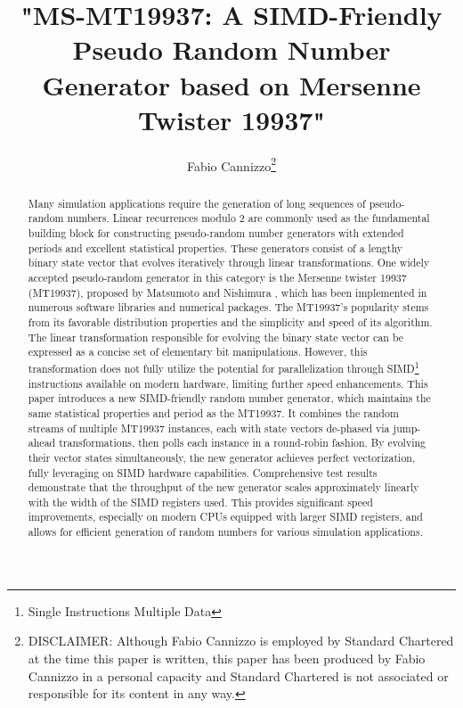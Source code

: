 \documentclass[preprint,1p,times]{elsarticle}
\begin{document}
\newenvironment{myitemize}
{ \begin{itemize} [topsep= 3pt] %
    \setlength{\itemsep}{0pt}
    \setlength{\parskip}{0pt}
    \setlength{\parsep}{0pt}     }
{ \end{itemize}                  }

\newcommand {\inred}[1] {\textcolor{red}{#1}}
\newcommand {\curle}[1]{ \left \{      #1 \right \}      }
\newcommand\XOR{\mathbin{\oplus}}
\newcommand\OR{\mid}
\newcommand\AND{\&}



\begin{frontmatter}
\title{"MS-MT19937: A SIMD-Friendly Pseudo Random Number Generator based on Mersenne Twister 19937"}

\author{\renewcommand*{\thefootnote}{\fnsymbol{footnote}}
	Fabio Cannizzo\footnote{DISCLAIMER: Although Fabio Cannizzo is employed by Standard Chartered at the time this paper is written, this paper has been produced by Fabio Cannizzo in a personal capacity and Standard Chartered is not associated or responsible for its content in any way.}}

\begin{abstract}
Many simulation applications require the generation of long sequences of pseudo-random numbers. Linear recurrences modulo 2 are commonly used as the fundamental building block for constructing pseudo-random number generators with extended periods and excellent statistical properties. These generators consist of a lengthy binary state vector that evolves iteratively through linear transformations. One widely accepted pseudo-random generator in this category is the Mersenne twister 19937 (MT19937), proposed by Matsumoto and Nishimura \cite{mt19937}, which has been implemented in numerous software libraries and numerical packages. The MT19937's popularity stems from its favorable distribution properties and the simplicity and speed of its algorithm. The linear transformation responsible for evolving the binary state vector can be expressed as a concise set of elementary bit manipulations. However, this transformation does not fully utilize the potential for parallelization through SIMD\footnote{Single Instructions Multiple Data} instructions available on modern hardware, limiting further speed enhancements.
This paper introduces a new SIMD-friendly random number generator, which maintains the same statistical properties and period as the MT19937. It combines the random streams of multiple MT19937 instances, each with state vectors de-phased via jump-ahead transformations, then polls each instance in a round-robin fashion. By evolving their vector states simultaneously, the new generator achieves perfect vectorization, fully leveraging on SIMD hardware capabilities. Comprehensive test results demonstrate that the throughput of the new generator scales approximately linearly with the width of the SIMD registers used. This provides significant speed improvements, especially on modern CPUs equipped with larger SIMD registers, and allows for efficient generation of random numbers for various simulation applications.
\end{abstract}


\end{frontmatter}
\end{document}
